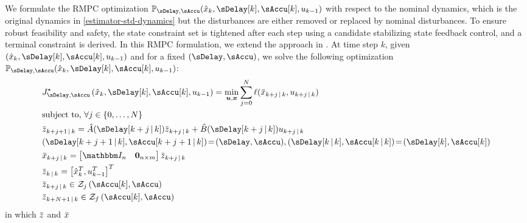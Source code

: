 
We formulate the RMPC optimization $\MPCProb{\sDelay,\sAccu}(\hat{x}_{k},\sDelay[k],\sAccu[k],u_{k-1})$
with respect to the nominal dynamics, which is the original dynamics
in \eqref{estimator-std-dynamics} but the disturbances are either
removed or replaced by nominal disturbances. To ensure robust feasibility
and safety, the state constraint set is tightened after each step
using a candidate stabilizing state feedback control, and a terminal
constraint is derived. In this RMPC formulation, we extend the approach
in \cite{richardsetal05rmp, chiscietal01swp}. At time step $k$, given
$(\hat{x}_{k},\sDelay[k],\sAccu[k],u_{k-1})$ and for a fixed $(\sDelay,\sAccu)$,
we solve the following optimization $\MPCProb{\sDelay,\sAccu}(\hat{x}_{k},\sDelay[k],\sAccu[k],u_{k-1})$:
\begin{subequations}
\label{eq:RMPC1}
\begin{align}
 & J_{\sDelay,\sAccu}^{\star}\left(\hat{x}_{k},\sDelay[k],\sAccu[k],u_{k-1}\right)=\min_{\boldsymbol{u},\boldsymbol{x}}\sum_{j=0}^{N}\ell(\Nom x_{k+j\Given k},u_{k+j\Given k})\\
 & \text{subject to, }\forall j\in\left\{ 0,\dots,N\right\} \nonumber \\
 & \Nom z_{k+j+1\Given k}=\hat{A}(\sDelay[k+j\Given k])\Nom z_{k+j\Given k}+\hat{B}(\sDelay[k+j\Given k])u_{k+j\Given k}\label{eq:RMPC1-dyn}\\
 & ( \sDelay[k+j+1\Given k],\sAccu[k+j+1\Given k] ) \!=\! (\sDelay,\sAccu ), (\sDelay[k\Given k],\sAccu[k\Given k]) \!=\! (\sDelay[k],\sAccu[k])  \label{eq:RMPC1-delay}\\
 & \Nom x_{k+j\Given k}=\begin{bmatrix}\IdentityMatrix_{n} & \bm{0}_{n\times m}\end{bmatrix}\Nom z_{k+j\Given k}\label{eq:RMPC1-z2x}\\
 & \Nom z_{k\Given k}=\left[\hat{x}_{k}^{T},u_{k-1}^{T}\right]^{T} \label{eq:RMPC1-z0}\\
 & \Nom z_{k+j\Given k}\in\ZSet_{j}\left(\sAccu[k],\sAccu\right)\label{eq:RMPC1-zset}\\
 & \Nom z_{k+N+1\Given k}\in\ZSet_{f}\left(\sAccu[k],\sAccu\right)\label{eq:RMPC1-zfinalset}
\end{align}
\end{subequations} in which $\Nom z$ and $\Nom x$

